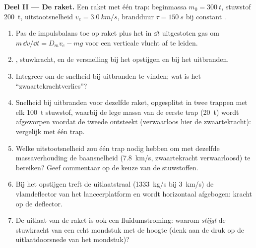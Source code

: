 \begin{problem}
\medskip
\noindent\textbf{Deel II --- De raket.}
Een raket met één trap: beginmassa $m_0 = \qty{300}{t}$, stuwstof
\qty{200}{t}, uitstootsnelheid $v_e = \qty{3.0}{km/s}$, brandduur
$\tau =
\qty{150}{s}$ bij constant .
\begin{enumerate}[resume]
  \item Pas de impulsbalans toe op raket plus het in $\dd t$ uitgestoten gas
        om $m\,\dd v/\dd t = D_mv_e - mg$ voor een verticale vlucht af te
        leiden.
  \item {}, stuwkracht, en de versnelling bij het opstijgen en bij
        het uitbranden.
  \item Integreer om de snelheid bij uitbranden te vinden; wat is het
        ``zwaartekrachtverlies''?
  \item Snelheid bij uitbranden voor dezelfde raket, opgesplitst in twee
        trappen met elk \qty{100}{t} stuwstof, waarbij de lege massa van de
        eerste trap (\qty{20}{t}) wordt afgeworpen voordat de tweede
        ontsteekt (verwaarloos hier de zwaartekracht): vergelijk met één
        trap.
  \item Welke uitstootsnelheid zou één trap nodig hebben om met dezelfde
        massaverhouding de baansnelheid (\qty{7.8}{km/s}, zwaartekracht
        verwaarloosd) te bereiken? Geef commentaar op de keuze van de
        stuwstoffen.
  \item Bij het opstijgen treft de uitlaatstraal (\qty{1333}{kg/s} bij
        \qty{3}{km/s}) de vlamdeflector van het lanceerplatform en wordt
        horizontaal afgebogen: kracht op de deflector.
  \item De uitlaat van de raket is ook een fluïdumstroming: waarom
        \emph{stijgt} de stuwkracht van een echt mondstuk met de hoogte
        (denk aan de druk op de uitlaatdoorsnede van het mondstuk)?
\end{enumerate}


\end{problem}
